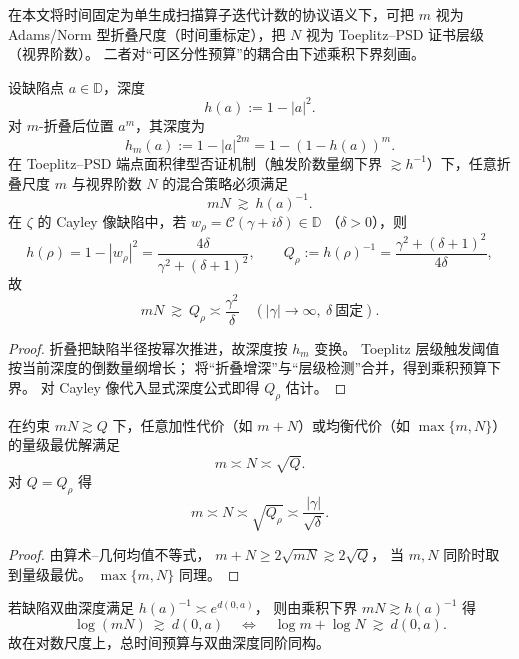 在本文将时间固定为单生成扫描算子迭代计数的协议语义下，可把 \(m\) 视为 Adams/Norm 型折叠尺度（时间重标定），把 \(N\) 视为 Toeplitz--PSD 证书层级（视界阶数）。
二者对“可区分性预算”的耦合由下述乘积下界刻画。

\begin{theorem}\label{thm:xi-time-horizon-product-lower-bound}
设缺陷点 \(a\in\mathbb D\)，深度
\[
h(a):=1-|a|^2.
\]
对 \(m\)-折叠后位置 \(a^m\)，其深度为
\[
h_m(a):=1-|a|^{2m}=1-(1-h(a))^m.
\]
在 Toeplitz--PSD 端点面积律型否证机制（触发阶数量纲下界 \(\gtrsim h^{-1}\)）下，任意折叠尺度 \(m\) 与视界阶数 \(N\) 的混合策略必须满足
\[
mN\ \gtrsim\ h(a)^{-1}.
\]
在 \(\zeta\) 的 Cayley 像缺陷中，若
\(
w_\rho=\mathcal C(\gamma+i\delta)\in\mathbb D
\)
（\(\delta>0\)），则
\[
h(\rho)=1-|w_\rho|^2
=\frac{4\delta}{\gamma^2+(\delta+1)^2},
\qquad
Q_\rho:=h(\rho)^{-1}
=\frac{\gamma^2+(\delta+1)^2}{4\delta},
\]
故
\[
mN\ \gtrsim\ Q_\rho\asymp \frac{\gamma^2}{\delta}\quad(|\gamma|\to\infty,\ \delta\ \text{固定}).
\]
\end{theorem}

\begin{proof}
折叠把缺陷半径按幂次推进，故深度按 \(h_m\) 变换。
Toeplitz 层级触发阈值按当前深度的倒数量纲增长；
将“折叠增深”与“层级检测”合并，得到乘积预算下界。
对 Cayley 像代入显式深度公式即得 \(Q_\rho\) 估计。
\end{proof}

\begin{proposition}[乘积约束下的最优配分平方根律]\label{prop:xi-optimal-allocation-under-product-bound}
在约束
\(
mN\gtrsim Q
\)
下，任意加性代价（如 \(m+N\)）或均衡代价（如 \(\max\{m,N\}\)）的量级最优解满足
\[
m\asymp N\asymp \sqrt Q.
\]
对 \(Q=Q_\rho\) 得
\[
m\asymp N\asymp \sqrt{Q_\rho}\asymp \frac{|\gamma|}{\sqrt\delta}.
\]
\end{proposition}

\begin{proof}
由算术--几何均值不等式，
\(
m+N\ge 2\sqrt{mN}\gtrsim 2\sqrt Q
\)，
当 \(m,N\) 同阶时取到量级最优。
\(\max\{m,N\}\) 同理。
\end{proof}

\begin{proposition}[双对数时间的双曲加性]\label{prop:xi-double-log-time-hyperbolic-additivity}
若缺陷双曲深度满足
\(
h(a)^{-1}\asymp e^{d(0,a)}
\)，
则由乘积下界 \(mN\gtrsim h(a)^{-1}\) 得
\[
\log(mN)\ \gtrsim\ d(0,a)
\quad\Longleftrightarrow\quad
\log m+\log N\ \gtrsim\ d(0,a).
\]
故在对数尺度上，总时间预算与双曲深度同阶同构。
\end{proposition}

